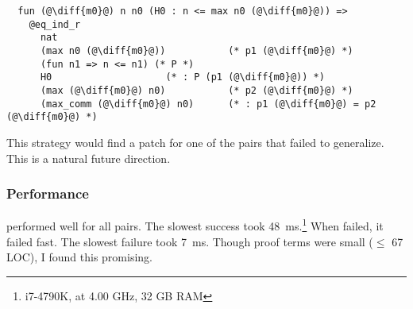 \begin{lstlisting}
  fun (@\diff{m0}@) n n0 (H0 : n <= max n0 (@\diff{m0}@)) =>
    @eq_ind_r
      nat
      (max n0 (@\diff{m0}@))           (* p1 (@\diff{m0}@) *)
      (fun n1 => n <= n1) (* P *)
      H0                    (* : P (p1 (@\diff{m0}@)) *)
      (max (@\diff{m0}@) n0)           (* p2 (@\diff{m0}@) *)
      (max_comm (@\diff{m0}@) n0)      (* : p1 (@\diff{m0}@) = p2 (@\diff{m0}@) *)
\end{lstlisting}
This strategy would find a patch for one of the pairs that \sysname failed to generalize.
This is a natural future direction.

\subsubsection{Performance}
\label{sec:perf}

\sysname performed well for all pairs. The slowest success took \SI{48}{\ms}.\footnote{i7-4790K, at 4.00 GHz, 32 GB RAM}
When \sysname failed, it failed fast. The slowest failure took \SI{7}{\ms}.
Though proof terms were small ($\le$ 67 LOC), I found this promising.


